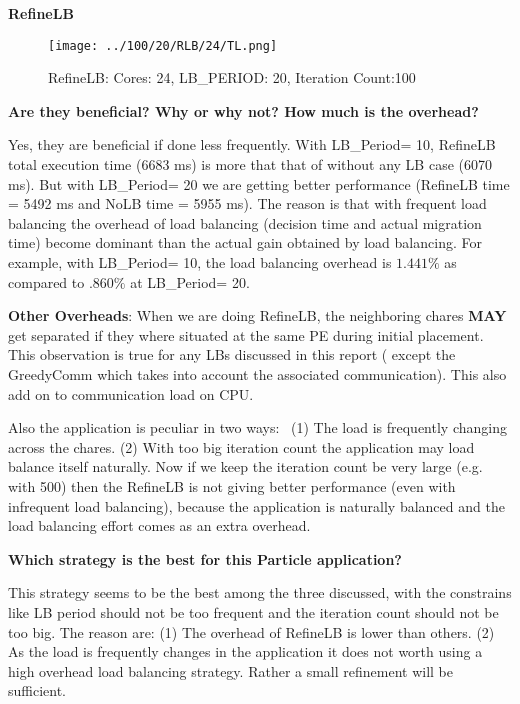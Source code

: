 \documentclass[10pt,times]{report}
\newcommand{\lbp}{LB\_Period}
\begin{document}
\begin{flushleft}
\textbf{\large{RefineLB}}
\end{flushleft}

  \begin{figure}[htbp]
    \begin{center}
       \texttt{[image: ../100/20/RLB/24/TL.png]} 
    \end{center}
    \caption{RefineLB: Cores: 24, LB\_PERIOD: 20, Iteration Count:100}
      \label{fig:1} 
  \end{figure}

  \begin{flushleft}
    \textbf{Are   they   beneficial?   Why   or   why   not?   How   much   is   the   overhead?}  
  \end{flushleft}
  Yes, they are beneficial if done less frequently. With \lbp = 10,
  RefineLB total execution time (6683 ms) is more that that of without any LB
case (6070 ms). But with \lbp = 20 we are getting better performance (RefineLB time = 5492 ms and NoLB time = 5955 ms). The reason is
that with frequent load balancing the overhead of load balancing (decision time
    and actual migration time) become dominant than the actual gain obtained by load
balancing. For example, with \lbp = 10, the load balancing overhead is $1.441\%$ as compared to $.860\%$ at \lbp = 20.    

  \textbf{\small{Other Overheads}}:  When we are doing RefineLB, the neighboring chares \textbf{MAY} get separated if they where situated  at the same PE during initial placement. This observation is true for any LBs discussed
  in this report ( except the GreedyComm which takes into account the associated communication). This also add on to communication load on CPU.

  Also the application is peculiar in two ways: \
      (1) The load is frequently changing across the chares.
      (2) With too big iteration count the application may load balance itself naturally.
    Now if we keep the iteration count be very large (e.g. with 500)
  then the RefineLB is not giving better performance (even with infrequent load balancing),  because the application is naturally balanced 
  and the load balancing effort comes as an extra overhead. 

  \begin{flushleft}
    \textbf{\small{Which  strategy  is  the  best  for  this  Particle  application?}}
  \end{flushleft}
  This strategy seems to be the best among the three discussed, with the constrains like LB period should not be too frequent
  and the iteration count should not be too big. The reason are:
  (1) The overhead of RefineLB is lower than others.
  (2) As the load is frequently changes in the application it does not worth using a high overhead load balancing strategy. Rather a small refinement 
  will be sufficient.
\end{document}
